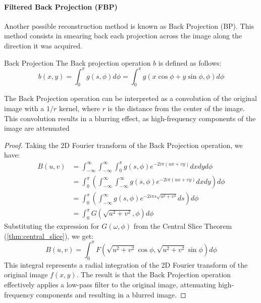 \paragraph{Filtered Back Projection (FBP)}
Another possible reconstruction method is known as Back Projection (BP).
This method consists in smearing back each projection across the image along the direction it was acquired.

\begin{definition}{Back Projection}
    \label{def:back_projection}
    The Back projection operation $b$ is defined as follows:
    \begin{equation}
        b(x, y) = \int_{0}^{\pi} g(s, \phi) d\phi = \int_{0}^{\pi} g(x \cos \phi + y \sin \phi, \phi) d\phi
    \end{equation}
\end{definition}

\begin{proposition}
    The Back Projection operation can be interpreted as a convolution of the original image with a $1/r$ kernel, where $r$ is the distance from the center of the image. This convolution results in a blurring effect, as high-frequency components of the image are attenuated
\end{proposition}

\begin{proof}
    Taking the 2D Fourier transform of the Back Projection operation, we have:
    \begin{align*}
        B(u, v) &= \int_{-\infty}^{\infty} \int_{-\infty}^{\infty} \int_{0}^{\pi} g(s, \phi) e^{-2i \pi (ux + vy)} dx dy d\phi\\
        &= \int_{0}^{\pi} \left( \int_{-\infty}^{\infty} \int_{-\infty}^{\infty} g(s, \phi) e^{-2i \pi (ux + vy)} dx dy \right) d\phi\\
        &= \int_{0}^{\pi} \left( \int_{-\infty}^{\infty} g(s, \phi) e^{-2i \pi s \sqrt{u^2 + v^2}} ds \right) d\phi\\
        &= \int_{0}^{\pi} G(\sqrt{u^2 + v^2}, \phi) d\phi
    \end{align*}
    Substituting the expression for $G(\omega, \phi)$ from the Central Slice Theorem (\ref{thm:central_slice}), we get:
    \begin{equation*}
        B(u,v) = \int_{0}^{\pi} F(\sqrt{u^2 + v^2} \cos \phi, \sqrt{u^2 + v^2} \sin \phi) d\phi
    \end{equation*}
    This integral represents a radial integration of the 2D Fourier transform of the original image $f(x,y)$.
    The result is that the Back Projection operation effectively applies a low-pass filter to the original image, attenuating high-frequency components and resulting in a blurred image.
\end{proof}

